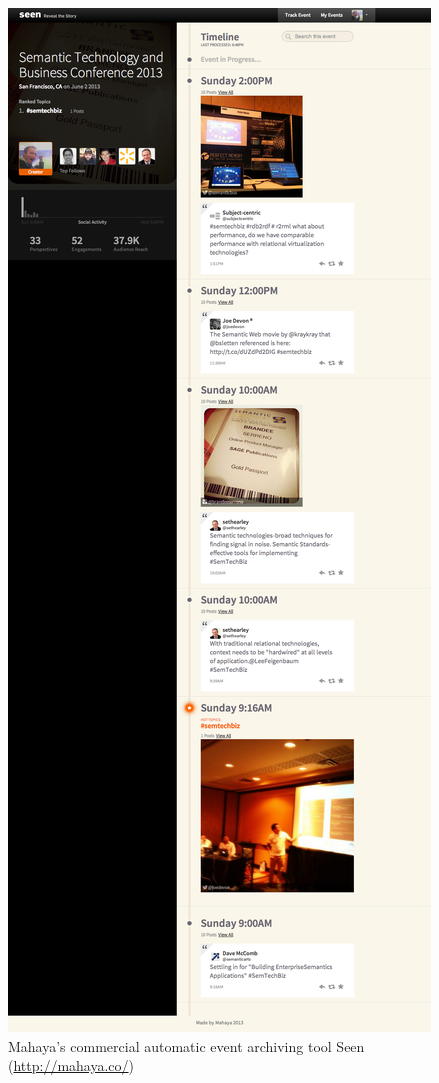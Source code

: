 \begin{figure}
  \centering
  \includegraphics[width=\linewidth]{seen.png}
  \caption{Mahaya's commercial automatic event archiving tool Seen
    (\url{http://mahaya.co/})}
  \label{fig:seen}
\end{figure}

